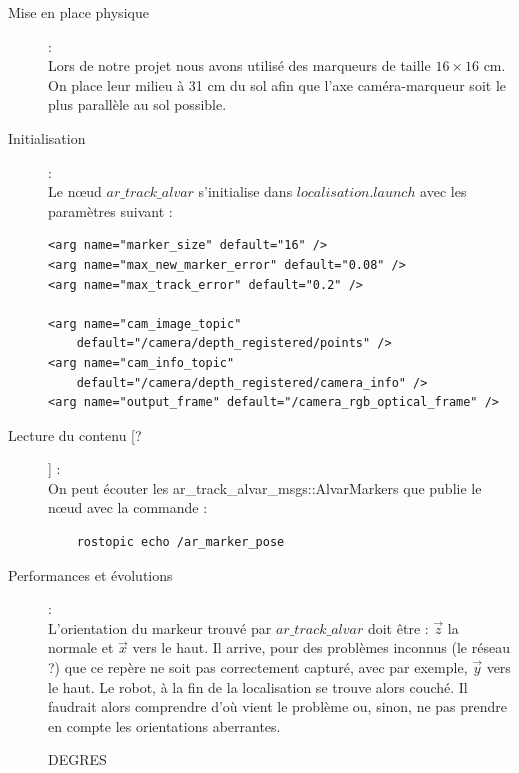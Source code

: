 \documentclass[10pt,a4paper]{article}
\begin{document}
\lstset{language=XML}
\begin{description}
\item [Mise en place physique] : \\
Lors de notre projet nous avons utilisé des marqueurs de taille $16 \times 16$ cm. On place leur milieu à 31 cm du sol afin que l'axe caméra-marqueur soit le plus parallèle au sol possible.
\item [Initialisation] : \\ Le nœud $ar\_track\_alvar$ s'initialise dans $localisation.launch$ avec les paramètres suivant : 
\begin{lstlisting}
<arg name="marker_size" default="16" />
<arg name="max_new_marker_error" default="0.08" />
<arg name="max_track_error" default="0.2" />

<arg name="cam_image_topic" 
	default="/camera/depth_registered/points" />
<arg name="cam_info_topic" 		
	default="/camera/depth_registered/camera_info" />
<arg name="output_frame" default="/camera_rgb_optical_frame" />
\end{lstlisting}

\item [Lecture du contenu [?]] : \\
	On peut écouter les ar\_track\_alvar\_msgs::AlvarMarkers que publie le nœud avec la commande : 
	\begin{lstlisting} 
	rostopic echo /ar_marker_pose
	\end{lstlisting}
\item [Performances et évolutions] : \\
	L'orientation du markeur trouvé par $ar\_track\_alvar$ doit être : $\vec{z}$ la normale et $\vec{x}$ vers le haut. Il arrive, pour des problèmes inconnus (le réseau ?) que ce repère ne soit pas correctement capturé, avec par exemple, $\vec{y}$ vers le haut. Le robot, à la fin de la localisation se trouve alors couché. Il faudrait alors comprendre d'où vient le problème ou, sinon, ne pas prendre en compte les orientations aberrantes. 

DEGRES

\end{description}
\end{document}

